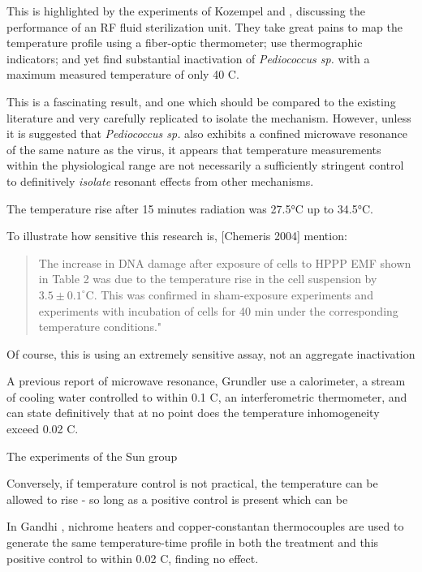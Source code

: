\documentclass[paper.tex]{subfiles}
\begin{document}
\begin{multicols}{1}
This is highlighted by the experiments of Kozempel \cite{Preliminary1997} and \cite{Inactivationa}, discussing the performance of an RF fluid sterilization unit. They take great pains to map the temperature profile using a fiber-optic thermometer; use thermographic indicators; and yet find substantial inactivation of {\it Pediococcus sp.} with a maximum measured temperature of only 40 C.

This is a fascinating result, and one which should be compared to the existing literature and very carefully replicated to isolate the mechanism. However, unless it is suggested that {\it Pediococcus sp.} also exhibits a confined microwave resonance of the same nature as the virus, it appears that temperature measurements within the physiological range are not necessarily a sufficiently stringent control to definitively {\it isolate} resonant effects from other mechanisms.


The temperature rise after 15 minutes radiation was 27.5°C up to 34.5°C.


To illustrate how sensitive this research is, [Chemeris 2004] mention:

\begin{quote}
	
	The increase in DNA damage after exposure of cells to HPPP EMF shown in Table 2 was due to the temperature rise in the cell suspension by $3.5\pm0.1^{\circ}  $C. This was confirmed in sham-exposure experiments and experiments with incubation of cells for 40 min under the corresponding temperature conditions."
	
\end{quote}

Of course, this is using an extremely sensitive assay, not an aggregate inactivation 

A previous report of microwave resonance, Grundler \cite{Sharp1983} use a calorimeter, a stream of cooling water controlled to within 0.1 C, an interferometric thermometer, and can state definitively that at no point does the temperature inhomogeneity exceed 0.02 C.

The experiments of the Sun group 

Conversely, if temperature control is not practical, the temperature can be allowed to rise - so long as a positive control is present which can be  

In Gandhi \cite{Basic1983}, nichrome heaters and copper-constantan thermocouples are used to generate the same temperature-time profile in both the treatment and this positive control to within 0.02 C, finding no effect. 



\end{multicols}
\end{document}
